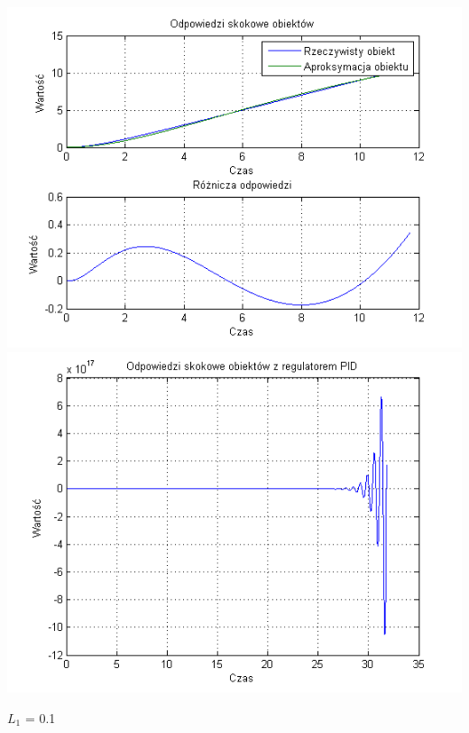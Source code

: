 \documentclass[10pt,a4paper]{article}
\begin{document}
\begin{center}
\includegraphics[scale=1]{images/dwa/skrypt_139.png}\\
\includegraphics[scale=1]{images/dwa/skrypt_140.png}\\
\end{center}
\newpage
$L_1$ = 0.1
\end{document}
